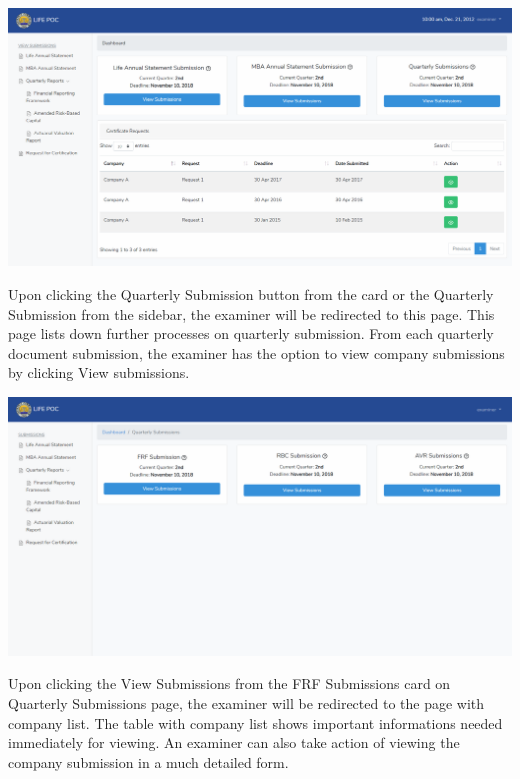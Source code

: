 \documentclass{article}
\begin{document}
\includegraphics[keepaspectratio=true]{up-ic-screens/image47}{}%

\mdhr{}%

\noindent{}Upon clicking the Quarterly Submission button from the
card or the Quarterly Submission from the sidebar, the examiner will be
redirected to this page. This page lists down further processes on
quarterly submission. From each quarterly document submission, the
examiner has the option to view company submissions by clicking View
submissions.%

\includegraphics[keepaspectratio=true]{up-ic-screens/image1}{}%

\mdhr{}%

\noindent{}Upon clicking the View Submissions from the FRF
Submissions card on Quarterly Submissions page, the examiner will be
redirected to the page with company list. The table with company list
shows important informations needed immediately for viewing. An examiner
can also take action of viewing the company submission in a much
detailed form.%
\end{document}
